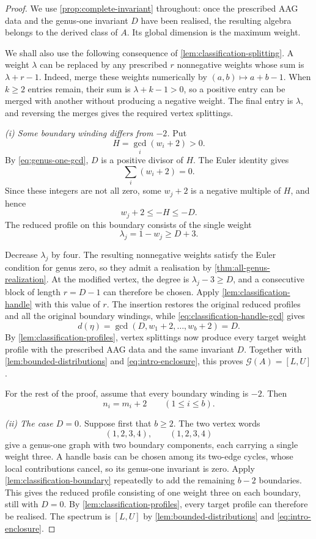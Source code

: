 \documentclass[11pt]{amsart}
\theoremstyle{definition}
\theoremstyle{plain}
\theoremstyle{definition}
\theoremstyle{definition}
\newcommand{\GSpec}{\mathcal G}
\begin{document}
\begin{proof}
We use \cref{prop:complete-invariant} throughout:
once the prescribed AAG data and the genus-one invariant
$D$ have been realised, the resulting algebra belongs
to the derived class of $A$.
Its global dimension is the maximum weight.

We shall also use the following consequence of
\cref{lem:classification-splitting}.
A weight $\lambda$ can be replaced by any prescribed
$r$ nonnegative weights whose sum is $\lambda+r-1$.
Indeed, merge these weights numerically by
$(a,b)\mapsto a+b-1$.
When $k\geq2$ entries remain, their sum is
$\lambda+k-1>0$, so a positive entry can be merged
with another without producing a negative weight.
The final entry is $\lambda$, and reversing the
merges gives the required vertex splittings.

\smallskip
\noindent\emph{(i) Some boundary winding differs from $-2$.}
Put
\[
 H=\gcd_i(w_i+2)>0.
\]
By \eqref{eq:genus-one-gcd}, $D$ is a positive divisor
of $H$.
The Euler identity gives
\[
 \sum_i(w_i+2)=0.
\]
Since these integers are not all zero, some $w_j+2$
is a negative multiple of $H$, and hence
\[
 w_j+2\leq-H\leq-D.
\]
The reduced profile on this boundary consists of
the single weight
\[
 \lambda_j=1-w_j\geq D+3.
\]

Decrease $\lambda_j$ by four.
The resulting nonnegative weights satisfy the Euler
condition for genus zero, so they admit a realisation
by \cref{thm:all-genus-realization}.
At the modified vertex, the degree is
$\lambda_j-3\geq D$, and a consecutive block of length
$r=D-1$ can therefore be chosen.
Apply \cref{lem:classification-handle} with this value
of $r$.
The insertion restores the original reduced profiles
and all the original boundary windings, while
\eqref{eq:classification-handle-gcd} gives
\[
 d(\eta)
 =\gcd(D,w_1+2,\ldots,w_b+2)
 =D.
\]
By \cref{lem:classification-profiles}, vertex splittings
now produce every target weight profile with the
prescribed AAG data and the same invariant $D$.
Together with \cref{lem:bounded-distributions} and
\eqref{eq:intro-enclosure}, this proves
$\GSpec(A)=[L,U]$.

For the rest of the proof, assume that every boundary
winding is $-2$.
Then
\[
 n_i=m_i+2
 \qquad(1\leq i\leq b).
\]

\smallskip
\noindent\emph{(ii) The case $D=0$.}
Suppose first that $b\geq2$.
The two vertex words
\[
 (1,2,3,4),\qquad(1,2,3,4)
\]
give a genus-one graph with two boundary components,
each carrying a single weight three.
A handle basis can be chosen among its two-edge
cycles, whose local contributions cancel, so its
genus-one invariant is zero.
Apply \cref{lem:classification-boundary} repeatedly
to add the remaining $b-2$ boundaries.
This gives the reduced profile consisting of one
weight three on each boundary, still with $D=0$.
By \cref{lem:classification-profiles}, every target
profile can therefore be realised.
The spectrum is $[L,U]$ by
\cref{lem:bounded-distributions} and
\eqref{eq:intro-enclosure}.


\end{proof}
\end{document}
